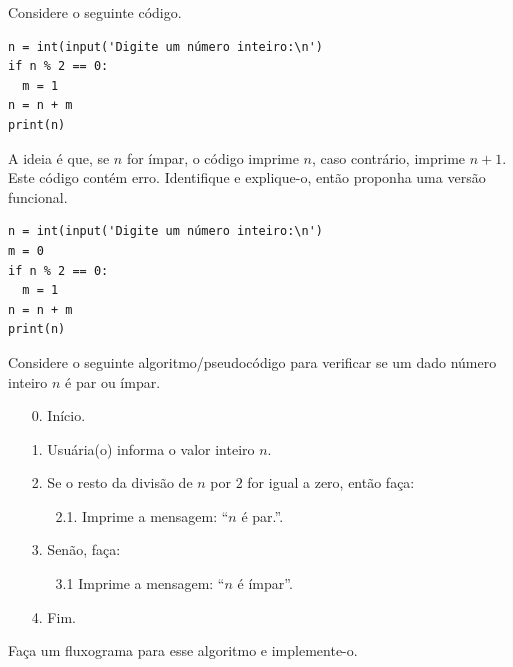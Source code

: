 \begin{exer}
  Considere o seguinte código.

\begin{lstlisting}
n = int(input('Digite um número inteiro:\n')
if n % 2 == 0:
  m = 1
n = n + m
print(n)
\end{lstlisting}

A ideia é que, se $n$ for ímpar, o código imprime $n$, caso contrário, imprime $n+1$. Este código contém erro. Identifique e explique-o, então proponha uma versão funcional.
\end{exer}
\begin{resp}

\begin{lstlisting}
n = int(input('Digite um número inteiro:\n')
m = 0
if n % 2 == 0:
  m = 1
n = n + m
print(n)
\end{lstlisting}

\end{resp}

\begin{exer}
  Considere o seguinte algoritmo/pseudocódigo para verificar se um dado número inteiro $n$ é par ou ímpar.

\ifisbook
\newpage
\fi
\begin{itemize}\setlength\itemsep{0em}
\item[0.] Início.
\item[1.] Usuária(o) informa o valor inteiro $n$.
\item[2.] Se o resto da divisão de $n$ por $2$ for igual a zero, então faça:
  \begin{itemize}\setlength\itemsep{0em}
  \item[2.1.] Imprime a mensagem: ``$n$ é par.''.
  \end{itemize}
\item[3.] Senão, faça:
  \begin{itemize}\setlength\itemsep{0em}
  \item[3.1] Imprime a mensagem: ``$n$ é ímpar''. 
  \end{itemize}
\item[4.] Fim.
\end{itemize}
Faça um fluxograma para esse algoritmo e implemente-o.
\end{exer}

